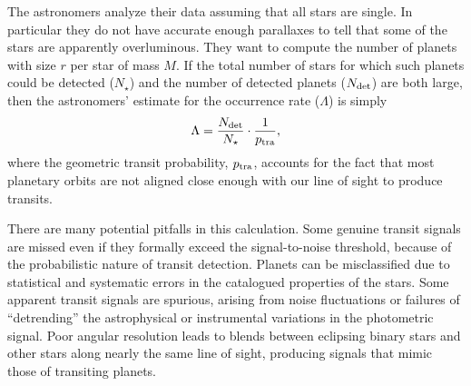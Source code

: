 \documentclass[12pt,modern]{aastex61}
\begin{document}
The astronomers analyze their data assuming that all stars are
single.  In particular they do not have accurate enough parallaxes to
tell that some of the stars are apparently overluminous.  They want to
compute the number of planets with size $r$ per star of mass $M$.  If
the total number of stars for which such planets could be detected
($N_\star$) and the number of detected planets ($N_{\rm det}$) are
both large, then the astronomers' estimate for the occurrence rate
($\Lambda$) is simply
\begin{equation}
  \Lambda = \frac{N_{\rm det}}{N_\star}
                    \cdot \frac{1}{p_{\rm tra}},
\label{eq:occ_rate_simple}
\end{equation}
where the geometric transit probability, $p_{\rm tra}$, accounts for
the fact that most planetary orbits are not aligned close enough with
our line of sight to produce transits.

There are many potential pitfalls in this calculation.  Some genuine
transit signals are missed even if they formally exceed the
signal-to-noise threshold, because of the probabilistic nature of
transit detection.  Planets can be misclassified due to statistical
and systematic errors in the catalogued properties of the stars.  Some
apparent transit signals are spurious, arising from noise fluctuations
or failures of ``detrending'' the astrophysical or instrumental
variations in the photometric signal.  Poor angular resolution leads
to blends between eclipsing binary stars and other stars along nearly
the same line of sight, producing signals that mimic those of
transiting planets.
\end{document}
